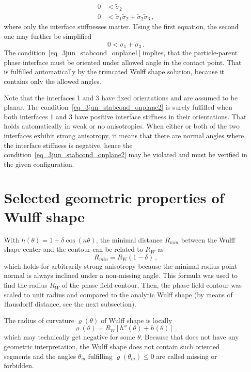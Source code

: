 \begin{align}
	0 &< \tilde{\sigma}_2  \label{eq_3jun_stabcond_onplane1}\\
	0 &< \tilde{\sigma}_1\tilde{\sigma}_2 + \tilde{\sigma}_2\tilde{\sigma}_3 \,,  
\end{align}
where only the interface stiffnesses matter. Using the first equation, the second one may further be simplified
\begin{equation}
	0< \tilde{\sigma}_1 + \tilde{\sigma}_3 \,. \label{eq_3jun_stabcond_onplane2}
\end{equation}
The condition~\eqref{eq_3jun_stabcond_onplane1} implies, that the particle-parent phase interface must be oriented under allowed angle in the contact point. That is fulfilled automatically by the truncated Wulff shape solution, because it contains only the allowed angles. 

Note that the interfaces 1 and 3 have fixed orientations and are assumed to be planar. The condition~\eqref{eq_3jun_stabcond_onplane2} is surely fulfilled when both interfaces 1 and 3 have positive interface stiffness in their orientations. That holds automatically in weak or no anisotropies. When either or both of the two interfaces exhibit strong anisotropy, it means that there are normal angles where the interface stiffness is negative, hence the condition~\eqref{eq_3jun_stabcond_onplane2} may be violated and must be verified in the given configuration.

\section{Selected geometric properties of Wulff shape}\label{sec_appendix_anisofun_props}
With $h(\theta)=1+\delta\cos(n\theta)$, the minimal distance $R_{min}$ between the Wulff shape center and the contour can be related to $R_W$ as
\begin{equation} \label{eq_appdx_wulff_minradius}
	R_{min} = R_W(1-\delta) \,,
\end{equation}
which holds for arbitrarily strong anisotropy because the minimal-radius point normal is always inclined under a non-missing angle. This formula was used to find the radius $R_W$ of the phase field contour. Then, the phase field contour was scaled to unit radius and compared to the analytic Wulff shape (by means of Hausdorff distance, see the next subsection). 

The radius of curvature $\varrho(\theta)$ of Wulff shape is locally
\begin{equation} \label{eq_Wulff_radius_curvature}
	\varrho(\theta) = R_W[h''(\theta) + h(\theta)] \,,
\end{equation}
which may technically get negative for some $\theta$. Because that does not have any geometric interpretation, the Wulff shape does not contain such oriented segments and the angles $\theta_m$ fulfilling $\varrho(\theta_m)\leq0$ are called missing or forbidden. \\

